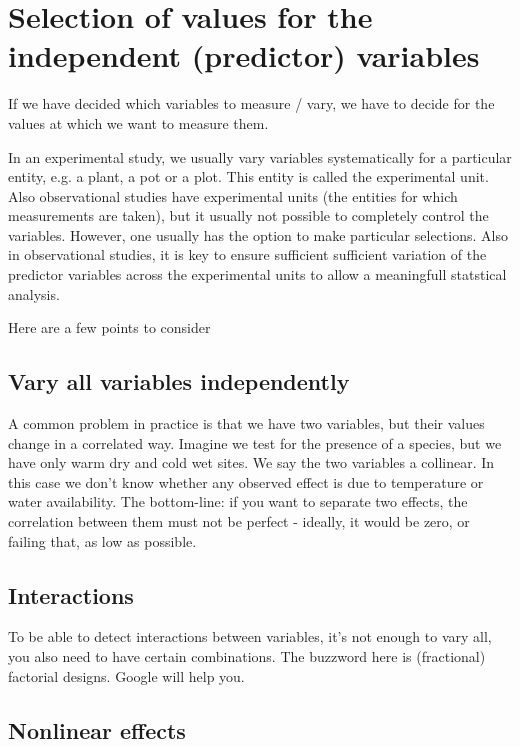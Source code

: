 \documentclass[a4paper,twoside]{tufte-book}\usepackage[]{graphicx}\usepackage[]{color}
\begin{document}
{\section{Selection of values for the independent (predictor) variables}

If we have decided which variables to measure / vary, we have to decide for the values at which we want to measure them. 

In an experimental study, we usually vary variables systematically for a particular entity, e.g. a plant, a pot or a plot. This entity is called the experimental unit. Also observational studies have experimental units (the entities for which measurements are taken), but it usually not possible to completely control the variables. However, one usually has the option to make particular selections. Also in observational studies, it is key to ensure sufficient sufficient variation of the predictor variables across the experimental units to allow a meaningfull statstical analysis.

Here are a few points to consider

\subsection{Vary all variables independently}

A common problem in practice is that we have two variables,  but their values change in a correlated way. Imagine we test for the presence of a species, but we have only warm dry and cold wet sites. We say the two variables a collinear. In this case we don't know whether any observed effect is due to temperature or water availability. The bottom-line: if you want to separate two effects, the correlation between them must not be perfect - ideally, it would be zero, or failing that, as low as possible. 

\subsection{Interactions}

To be able to detect interactions between variables, it's not enough to vary all, you also need to have certain combinations. The buzzword here is (fractional) factorial designs. Google will help you.

\subsection{Nonlinear effects}

}
\end{document}
